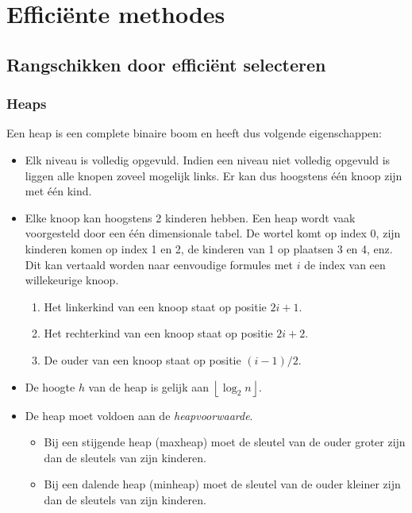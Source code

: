 \documentclass{report}
\begin{document}
    
\chapter{Effici\"ente methodes}
\section{Rangschikken door effici\"ent selecteren}
\subsection{Heaps}
Een heap is een complete binaire boom en heeft dus volgende eigenschappen:
\begin{itemize}
 \item Elk niveau is volledig opgevuld. Indien een niveau niet volledig opgevuld is liggen alle knopen zoveel mogelijk links. Er kan dus hoogstens één knoop zijn met één kind.
 \item Elke knoop kan hoogstens 2 kinderen hebben. Een heap wordt vaak voorgesteld door een één dimensionale tabel. De wortel komt op index 0, zijn kinderen komen op index 1 en 2, de kinderen van 1 op plaatsen 3 en 4, enz. Dit kan vertaald worden naar eenvoudige formules met $i$ de index van een willekeurige knoop.
 \begin{enumerate}
  \item Het linkerkind van een knoop staat op positie $2i + 1$.
  \item Het rechterkind van een knoop staat op positie $2i + 2$.
  \item De ouder van een knoop staat op positie $(i - 1)/2$.
 \end{enumerate}
 \item De hoogte $h$ van de heap is gelijk aan $\left \lfloor \log_2 n \right \rfloor$.
 \item De heap moet voldoen aan de \textit{heapvoorwaarde}. 
 \begin{itemize}
  \item Bij een stijgende heap (maxheap) moet de sleutel van de ouder groter zijn dan de sleutels van zijn kinderen.
  \item Bij een dalende heap (minheap) moet de sleutel van de ouder kleiner zijn dan de sleutels van zijn kinderen.
 \end{itemize}
\end{itemize}
\end{document}
